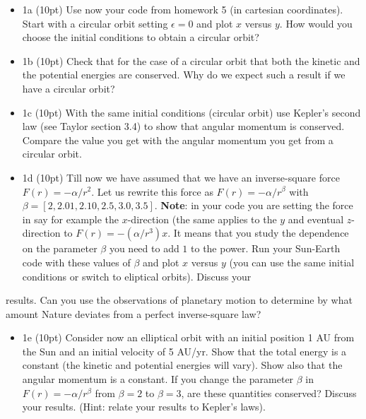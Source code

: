 \documentclass[%
oneside,                 %
final,                   %
10pt]{article}
\begin{document}
\begin{itemize}
\item 1a (10pt) Use now your code from homework 5 (in cartesian coordinates). Start with a circular orbit setting $\epsilon=0$ and plot $x$ versus $y$. How would you choose the initial conditions to obtain a circular orbit?

\item 1b (10pt) Check that for the case of a circular orbit that both the kinetic and the potential energies are conserved. Why do we expect such a result if we have a circular orbit? 

\item 1c (10pt) With the same initial conditions (circular orbit) use Kepler's second law (see Taylor section 3.4) to show that angular momentum is conserved. Compare the value you get with the angular momentum you get from a circular orbit. 

\item 1d (10pt) Till now we have assumed that we have an inverse-square force $F(r) = -\alpha/r^2$. Let us rewrite this force as $F(r) =-\alpha/r^{\beta}$ with $\beta=[2,2.01,2.10,2.5,3.0,3.5]$. \textbf{Note}: in your code you are setting the force in say for example the $x$-direction (the same applies to the $y$ and eventual $z$-direction to $F(r) = -(\alpha/r^3)x$. It means that you study the dependence on the parameter $\beta$ you need to add $1$ to the power. Run your Sun-Earth code with these values of $\beta$ and plot $x$ versus $y$ (you can use the same initial conditions or switch to eliptical orbits). Discuss your
\end{itemize}

\noindent
results. Can you use the observations of planetary motion to determine by what amount Nature deviates from a perfect inverse-square law?



\begin{itemize}
\item 1e (10pt) Consider now an elliptical orbit with an initial position 1 AU from the Sun and an initial  velocity of 5 AU/yr. Show that the total energy is a constant (the kinetic and potential energies will vary). Show also that the angular momentum is a constant. If you change the parameter $\beta$ in $F(r) = -\alpha/r^{\beta}$ from $\beta=2$ to $\beta=3$, are these quantities conserved?  Discuss your results. (Hint: relate your results to Kepler's laws). 
\end{itemize}
\end{document}
